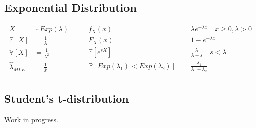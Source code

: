 \subsection{Exponential Distribution}
\begin{equation*}
    \begin{aligned}
        X &\sim Exp(\lambda) \qquad\\
        \mathbb{E}[X] &= \frac{1}{\lambda} \\
        \mathbb{V}[X] &= \frac{1}{\lambda^2} \\
        \hat{\lambda}_{MLE} &= \frac{1}{\bar{x}} \\
    \end{aligned}
    \begin{aligned}
        f_X(x) &= \lambda e^{-\lambda x} \quad x \ge 0, \lambda > 0 \\
        F_X(x) &= 1 - e^{-\lambda x} \\
        \mathbb{E}[e^{sX}] &= \frac{\lambda}{\lambda - s} \quad s < \lambda \\
        \mathbb{P}[Exp(\lambda_1) < Exp(\lambda_2)] &= \frac{\lambda_1}{\lambda_1 + \lambda_2}\\
    \end{aligned}
\end{equation*}

\subsection{Student's t-distribution}
Work in progress.
